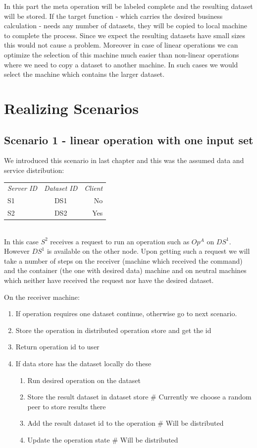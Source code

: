 In this part the meta operation will be labeled complete and the resulting dataset will be stored.
If the target function - which carries the desired business calculation - needs any number of datasets,
they will be copied to local machine to complete the process. 
Since we expect the resulting datasets have small sizes this would not cause a problem. 
Moreover in case of linear operations we can optimize the selection of this machine much easier than
non-linear operations where we need to copy a dataset to another machine. 
In such cases we would select the machine which contains the larger dataset.


\section{Realizing Scenarios}
\subsection{Scenario 1 - linear operation with one input set}
We introduced this scenario in last chapter and this was the assumed data and service distribution:

\begin{tabular}{ l c r }
\em{Server ID} & \em{ Dataset ID} & \em{ Client} \\
S1 & DS1 & No \\
S2 & DS2 & Yes \\
\end{tabular}\\

In this case \(S^2\) receives a request to run an operation such as \(Op^A\) on \(DS^1\).
However \(DS^1\) is available on the other node.
Upon getting such a request we will take a number of steps on the receiver (machine which received the command)
and the container (the one with desired data) machine and on neutral machines which neither have received the
request nor have the desired dataset.

On the receiver machine:
\begin{enumerate}
\item If operation requires one dataset continue, otherwise go to next scenario.
\item Store the operation in distributed operation store and get the id
\item Return operation id to user
\item If data store has the dataset locally do these
  \begin{enumerate}
  \item Run desired operation on the dataset
  \item Store the result dataset in dataset store \# Currently we choose a random peer to store results there
  \item Add the result dataset id to the operation \# Will be distributed
  \item Update the operation state \# Will be distributed
  \end{enumerate}
\end{enumerate}

